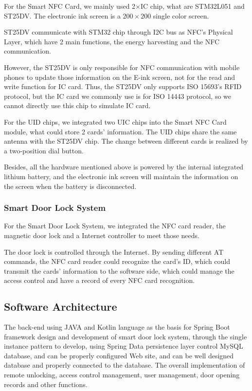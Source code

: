 \documentclass[11pt, a4paper]{article}
\begin{document}
For the Smart NFC Card, we mainly used 2$\times$IC chip, what are STM32L051 and ST25DV. The electronic ink screen is a $200 \times 200$ single color screen.

ST25DV communicate with STM32 chip through I2C bus as NFC's Physical Layer, which have 2 main functions, the energy harvesting and the NFC communication.

However, the ST25DV is only responsible for NFC communication with mobile phones to update those information on the E-ink screen, not for the read and write function for IC card. Thus, the ST25DV only supports ISO 15693's RFID protocol, but the IC card we commonly use is for ISO 14443 protocol, so we cannot directly use this chip to simulate IC card.

For the UID chips, we integrated two UIC chips into the Smart NFC Card module, what could store 2 cards' information. The UID chips share the same antenna with the ST25DV chip. The change between different cards is realized by a two-position dial button.

Besides, all the hardware mentioned above is powered by the internal integrated lithium battery, and the electronic ink screen will maintain the information on the screen when the battery is disconnected.

\subsubsection{Smart Door Lock System}

For the Smart Door Lock System, we integrated the NFC card reader, the magnetic door lock and a Internet controller to meet those needs.

The door lock is controlled through the Internet. By sending different AT commands, the NFC card reader could recognize the card's ID, which could transmit the cards' information to the software side, which could manage the access control and have a record of every NFC card recognition.


\subsection{Software Architecture}
The back-end using JAVA and Kotlin language as the basis for Spring Boot framework design and development of smart door lock system, through the single instance pattern to develop, using Spring Data persistence layer control MySQL database, and can be properly configured Web site, and can be well designed database and properly connected to the database.  The overall implementation of remote unlocking, access control management, user management, door opening records and other functions.
\end{document}
